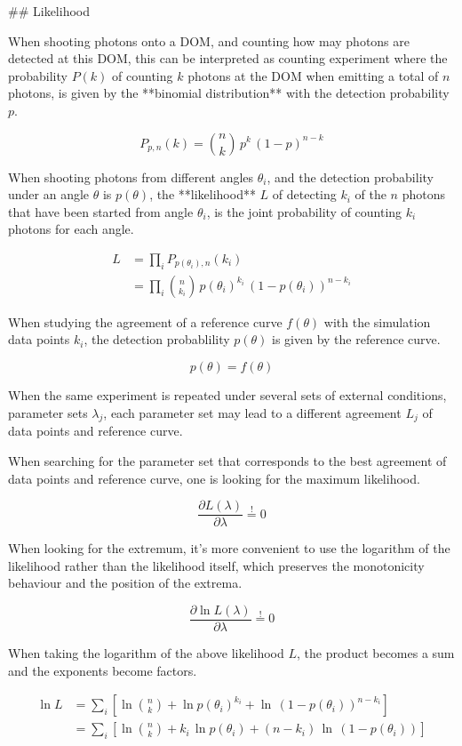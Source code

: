 
## Likelihood

When shooting photons onto a DOM, and counting how may photons are detected at this DOM, this can be interpreted as counting experiment where the probability $P(k)$ of counting $k$ photons at the DOM when emitting a total of $n$ photons, is given by the **binomial distribution** with the detection probability $p$.

$$ P_{p,n}(k) = \binom{n}{k}\,p^k\,(1-p)^{n-k} $$

When shooting photons from different angles $\theta_i$, and the detection probability under an angle $\theta$ is $p(\theta)$, the **likelihood** $L$ of detecting $k_i$ of the $n$ photons that have been started from angle $\theta_i$, is the joint probability of counting $k_i$ photons for each angle.

\begin{align*}
  L &= \prod_{i} P_{p(\theta_i),n}(k_i) \\
    &= \prod_{i} \binom{n}{k_i}\,p(\theta_i)^{k_i}\,(1-p(\theta_i))^{n-k_i}
\end{align*}

When studying the agreement of a reference curve $f(\theta)$ with the simulation data points $k_i$, the detection probablility $p(\theta)$ is given by the reference curve.

$$ p(\theta) = f(\theta) $$

When the same experiment is repeated under several sets of external conditions, parameter sets $\lambda_j$, each parameter set may lead to a different agreement $L_j$ of data points and reference curve.

When searching for the parameter set that corresponds to the best agreement of data points and reference curve, one is looking for the maximum likelihood.

$$ \frac{\partial L(\lambda)}{\partial \lambda} \stackrel{!}{=} 0 $$

When looking for the extremum, it's more convenient to use the logarithm of the likelihood rather than the likelihood itself, which preserves the monotonicity behaviour and the position of the extrema.

$$ \frac{\partial \ln L(\lambda)}{\partial \lambda} \stackrel{!}{=} 0 $$

When taking the logarithm of the above likelihood $L$, the product becomes a sum and the exponents become factors.

\begin{align*}
  \ln L &= \sum_i \left[ \ln \binom{n}{k} + \ln p(\theta_i)^{k_i} + \ln\,(1 - p(\theta_i))^{n-k_i} \right] \\
        &= \sum_i \left[ \ln \binom{n}{k} + k_i\,\ln p(\theta_i) + (n-k_i)\,\ln\,(1 - p(\theta_i)) \right]
\end{align*}


